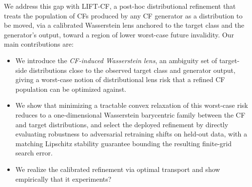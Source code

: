 
We address this gap with \textsc{LIFT-CF}, a post-hoc distributional refinement that treats the population of CFs produced by any CF generator as a distribution to be moved, via a calibrated Wasserstein lens anchored to the target class and the generator's output, toward a region of lower worst-case future invalidity.
Our main contributions are:
\begin{itemize}
    \item We introduce the \emph{CF-induced Wasserstein lens}, an ambiguity set of target-side distributions close to the observed target class and generator output, giving a worst-case notion of distributional lens risk that a refined CF population can be optimized against.
    \item We show that minimizing a tractable convex relaxation of this worst-case risk reduces to a one-dimensional Wasserstein barycentric family between the CF and target distributions, and select the deployed refinement by directly evaluating robustness to adversarial retraining shifts on held-out data, with a matching Lipschitz stability guarantee bounding the resulting finite-grid search error.
    \item We realize the calibrated refinement via optimal transport and show empirically that it \textcolor{latte_maroon}{experiments?}
\end{itemize}